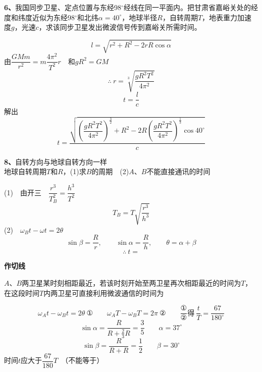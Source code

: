 \begin{problem}[6]
\textbf{6、}我国同步卫星、定点位置与东经98$^\circ$经线在同一平面内。把甘肃省嘉峪关处的经度和纬度近似为东经98$^\circ$和北纬$\alpha=40^\circ$，地球半径$R$，自转周期$T$，地表重力加速度$g$，光速$c$，求该同步卫星发出微波信号传到嘉峪关所需时间。%
\begin{solution}
\[ l=\sqrt{r^2+R^2-2rR\cos\alpha} \]
由$\dfrac{GMm}{r^2}=m\dfrac{4\pi^2}{T^2}r$　和$gR^2=GM$
\[ \therefore\ r=\sqrt[3]{\dfrac{gR^2T^2}{4\pi^2}} \]
\[ t=\dfrac{l}{c} \]
解出
\[ t=\dfrac{\sqrt{\left(\dfrac{gR^2T^2}{4\pi^2}\right)^{\frac{3}{2}}+R^2-2R\left(\dfrac{gR^2T^2}{4\pi^2}\right)^{\frac{1}{3}}\cos 40^\circ}}{c} \] %
\end{solution}
\end{problem}

\begin{problem}[8]
\textbf{8、}自转方向与地球自转方向一样\\
地球自转周期$T$和$R$，(1)求$B$的周期　(2)$A$、$B$不能直接通讯的时间%
\begin{solution}
(1)　由开三　$\dfrac{r^3}{T_B^2}=\dfrac{h^3}{T^2}$
\[ T_B=T\sqrt{\dfrac{r^3}{h^3}} \]
(2)　$\omega_B t-\omega t=2\theta$
\[ \sin\beta=\dfrac{R}{r},\qquad \sin\alpha=\dfrac{R}{h},\qquad \theta=\alpha+\beta \]
\[ \therefore\ t= \]
\end{solution}
\end{problem}

\textbf{作切线}

\begin{problem}
$A$、$B$两卫星某时刻相距最近，若该时刻开始至两卫星再次相距最近的时间为$T$，在这段时间$T$内两卫星可直接利用微波通信的时间为%
\begin{solution}
\[ \omega_A t-\omega_B t=2\theta\ \text{①}\qquad \omega_A T-\omega_B T=2\pi\ \text{②}\qquad \dfrac{\text{①}}{\text{②}}\text{得}\ \dfrac{t}{T}=\dfrac{67}{180^\circ} \]
\[ \sin\alpha=\dfrac{R}{R+\frac{2}{3}R}=\dfrac{3}{5}\qquad \alpha=37^\circ \]
\[ \sin\beta=\dfrac{R}{R+R}=\dfrac{1}{2}\qquad \beta=30^\circ \]
时间$t$应大于$\dfrac{67}{180}T$　（不能等于）
\end{solution}
\end{problem}

